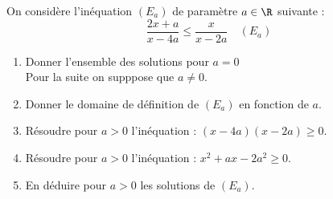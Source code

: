 \documentclass[a4paper, 11pt,reqno]{article}
\begin{document}
\begin{exercice}
On considère l'inéquation $(E_a)$ de paramètre $a\in \R$ suivante  :
$$ \frac{2x+a}{x-4a}  \leq \frac{x}{x-2a} \quad (E_a)$$

\begin{enumerate}
\item Donner l'ensemble des solutions pour $a=0$\\

Pour la suite on supppose que $a\neq 0$.
\item Donner le domaine de définition de $(E_a)$ en fonction de $a$. 
\item Résoudre pour $a>0$ l'inéquation : $(x-4a)(x-2a)\geq 0$.
\item Résoudre pour $a>0$ l'inéquation : $x^2+ax-2a^2\geq 0$.
\item En déduire pour $a>0$ les solutions de $(E_a)$. 
\end{enumerate}
\end{exercice}
\end{document}
